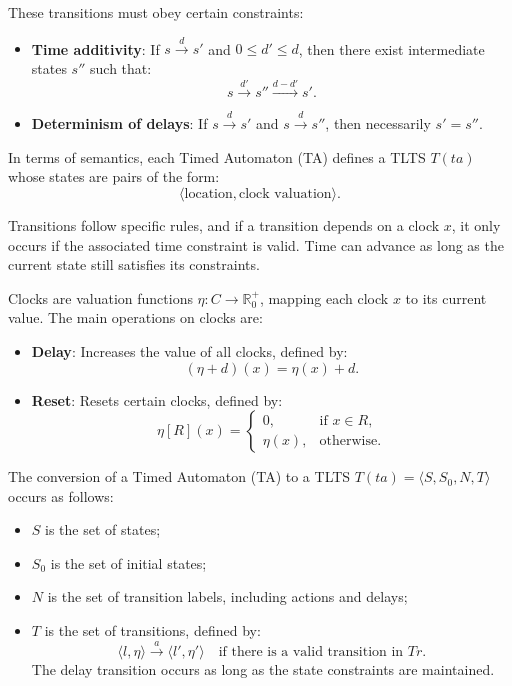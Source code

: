 These transitions must obey certain constraints:

\begin{itemize}
    \item \textbf{Time additivity}: If \( s \xrightarrow{d} s' \) and \( 0 \leq d' \leq d \), then there exist intermediate states \( s'' \) such that:
    \[
        s \xrightarrow{d'} s'' \xrightarrow{d - d'} s'.
    \]
    \item \textbf{Determinism of delays}: If \( s \xrightarrow{d} s' \) and \( s \xrightarrow{d} s'' \), then necessarily \( s' = s'' \).
\end{itemize}

In terms of semantics, each Timed Automaton (TA) defines a TLTS \( T(ta) \) whose states are pairs of the form:
\[
    \langle \text{location}, \text{clock valuation} \rangle.
\]

Transitions follow specific rules, and if a transition depends on a clock \( x \), it only occurs if the associated time constraint is valid. Time can advance as long as the current state still satisfies its constraints.

Clocks are valuation functions \( \eta: C \to \mathbb{R}^+_0 \), mapping each clock \( x \) to its current value. The main operations on clocks are:

\begin{itemize}
    \item \textbf{Delay}: Increases the value of all clocks, defined by:
    \[
        (\eta + d)(x) = \eta(x) + d.
    \]
    \item \textbf{Reset}: Resets certain clocks, defined by:
    \[
        \eta[R](x) = 
        \begin{cases}
            0, & \text{if } x \in R, \\
            \eta(x), & \text{otherwise}.
        \end{cases}
    \]
\end{itemize}

The conversion of a Timed Automaton (TA) to a TLTS \( T(ta) = \langle S, S_0, N, T \rangle \) occurs as follows:

\begin{itemize}
    \item \( S \) is the set of states;
    \item \( S_0 \) is the set of initial states;
    \item \( N \) is the set of transition labels, including actions and delays;
    \item \( T \) is the set of transitions, defined by:
    \[
        \langle l, \eta \rangle \xrightarrow{a} \langle l', \eta' \rangle \quad \text{if there is a valid transition in } Tr.
    \]
    The delay transition occurs as long as the state constraints are maintained.
\end{itemize}




